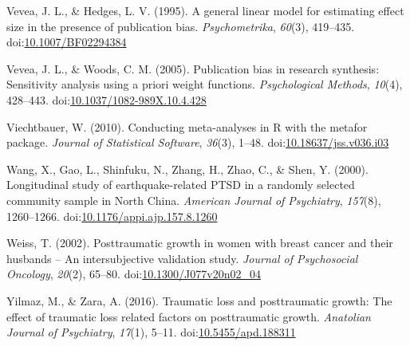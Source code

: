 \documentclass[man, mask]{apa6}
\theoremstyle{definition}
\theoremstyle{definition}
\theoremstyle{definition}
\theoremstyle{remark}
\begin{document}
\hypertarget{ref-Vevea1995}{}
Vevea, J. L., \& Hedges, L. V. (1995). A general linear model for
estimating effect size in the presence of publication bias.
\emph{Psychometrika}, \emph{60}(3), 419--435.
doi:\href{https://doi.org/10.1007/BF02294384}{10.1007/BF02294384}

\hypertarget{ref-Vevea2005}{}
Vevea, J. L., \& Woods, C. M. (2005). Publication bias in research
synthesis: Sensitivity analysis using a priori weight functions.
\emph{Psychological Methods}, \emph{10}(4), 428--443.
doi:\href{https://doi.org/10.1037/1082-989X.10.4.428}{10.1037/1082-989X.10.4.428}

\hypertarget{ref-Viechtbauer2010}{}
Viechtbauer, W. (2010). Conducting meta-analyses in R with the metafor
package. \emph{Journal of Statistical Software}, \emph{36}(3), 1--48.
doi:\href{https://doi.org/10.18637/jss.v036.i03}{10.18637/jss.v036.i03}

\hypertarget{ref-Wang2000}{}
Wang, X., Gao, L., Shinfuku, N., Zhang, H., Zhao, C., \& Shen, Y.
(2000). Longitudinal study of earthquake-related PTSD in a randomly
selected community sample in North China. \emph{American Journal of
Psychiatry}, \emph{157}(8), 1260--1266.
doi:\href{https://doi.org/10.1176/appi.ajp.157.8.1260}{10.1176/appi.ajp.157.8.1260}

\hypertarget{ref-Weiss2002}{}
Weiss, T. (2002). Posttraumatic growth in women with breast cancer and
their husbands -- An intersubjective validation study. \emph{Journal of
Psychosocial Oncology}, \emph{20}(2), 65--80.
doi:\href{https://doi.org/10.1300/J077v20n02_04}{10.1300/J077v20n02\_04}

\hypertarget{ref-Yilmaz2016}{}
Yilmaz, M., \& Zara, A. (2016). Traumatic loss and posttraumatic growth:
The effect of traumatic loss related factors on posttraumatic growth.
\emph{Anatolian Journal of Psychiatry}, \emph{17}(1), 5--11.
doi:\href{https://doi.org/10.5455/apd.188311}{10.5455/apd.188311}
\end{document}
